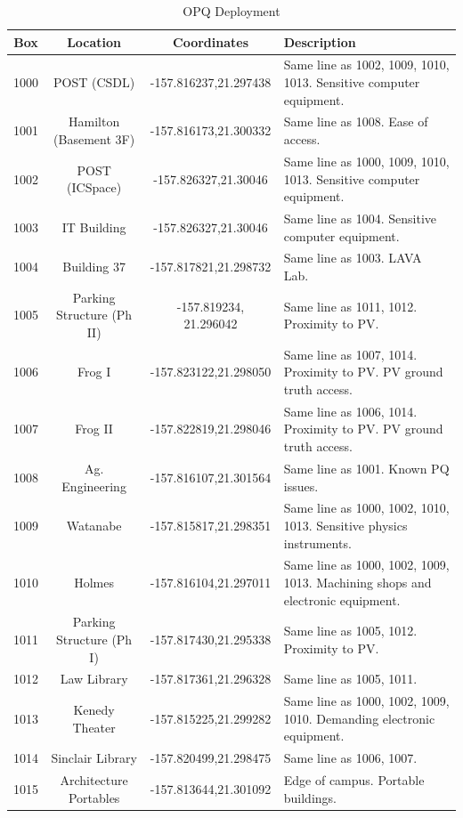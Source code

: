 \begin{table}[H]
	\centering
	\caption{OPQ Deployment}
	\begin{tabular}{|c|c|c|p{7cm}||}
		\hline 
		Box & Location & Coordinates & Description \\ 
		\hline
		1000 & POST (CSDL) & -157.816237,21.297438 & Same line as 1002, 1009, 1010, 1013. Sensitive computer equipment. \\
		\hline
		1001 & Hamilton (Basement 3F) & -157.816173,21.300332 & Same line as 1008. Ease of access. \\
		\hline
		1002 & POST (ICSpace) & -157.826327,21.30046 & Same line as 1000, 1009, 1010, 1013. Sensitive computer equipment.   \\
		\hline
		1003 & IT Building & -157.826327,21.30046 & Same line as 1004. Sensitive computer equipment. \\
		\hline
		1004 & Building 37 & -157.817821,21.298732 & Same line as 1003. LAVA Lab. \\
		\hline
		1005 & Parking Structure (Ph II) & -157.819234, 21.296042 & Same line as 1011, 1012. Proximity to PV. \\
		\hline
		1006 & Frog I & -157.823122,21.298050 & Same line as 1007, 1014. Proximity to PV. PV ground truth access. \\
		\hline
		1007 & Frog II & -157.822819,21.298046 & Same line as 1006, 1014. Proximity to PV. PV ground truth access.  \\
		\hline
		1008 & Ag. Engineering & -157.816107,21.301564 & Same line as 1001. Known PQ issues. \\
		\hline
		1009 & Watanabe & -157.815817,21.298351 & Same line as 1000, 1002, 1010, 1013. Sensitive physics instruments. \\
		\hline
		1010 & Holmes & -157.816104,21.297011 & Same line as 1000, 1002, 1009, 1013. Machining shops and electronic equipment. \\
		\hline
		1011 & Parking Structure (Ph I) & -157.817430,21.295338 & Same line as 1005, 1012. Proximity to PV. \\
		\hline
		1012 & Law Library & -157.817361,21.296328 & Same line as 1005, 1011. \\
		\hline
		1013  & Kenedy Theater & -157.815225,21.299282 & Same line as 1000, 1002, 1009, 1010. Demanding electronic equipment. \\
		\hline
		1014 & Sinclair Library & -157.820499,21.298475 & Same line as 1006, 1007. \\
		\hline
		1015 & Architecture Portables & -157.813644,21.301092 & Edge of campus. Portable buildings. \\
		\hline
	\end{tabular} 
	\label{table:OpqDeployment}
\end{table}

